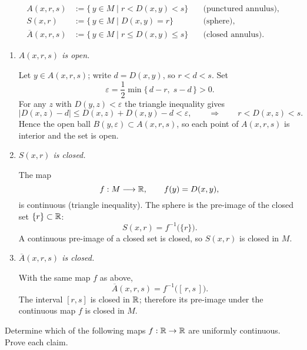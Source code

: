 \documentclass[12pt]{article}
\theoremstyle{definition} %
\theoremstyle{plain} %
\begin{document}
\[
\begin{aligned}
A(x,r,s) &:= \{\,y\in M\mid r<D(x,y)<s\}\quad &\text{(punctured annulus)},\\
S(x,r)   &:= \{\,y\in M\mid D(x,y)=r\}\quad &\text{(sphere)},\\
\overline A(x,r,s) &:= \{\,y\in M\mid r\le D(x,y)\le s\}
                           &\text{(closed annulus).}
\end{aligned}
\]

\begin{enumerate}[label=\textbf{(\alph*)}]
\item \emph{\(A(x,r,s)\) is open.}

   Let \(y\in A(x,r,s)\); write \(d=D(x,y)\), so \(r<d<s\).
   Set
   \[
      \varepsilon=\frac12\min\bigl\{\,d-r,\;s-d\,\bigr\}>0.
   \]
   For any \(z\) with \(D(y,z)<\varepsilon\) the triangle inequality
   gives
   \[
      |D(x,z)-d|\le D(x,z)+D(x,y)-d<\varepsilon,
      \qquad\Longrightarrow\qquad
      r< D(x,z)< s .
   \]
   Hence the open ball \(B(y,\varepsilon)\subset A(x,r,s)\), so each
   point of \(A(x,r,s)\) is interior and the set is open.

\item \emph{\(S(x,r)\) is closed.}

   The map
   \[
      f:M\longrightarrow\Bbb R,\qquad f(y)=D(x,y),
   \]
   is continuous (triangle inequality).
   The sphere is the pre-image of the closed set \(\{r\}\subset\Bbb R\):
   \[
      S(x,r)=f^{-1}\bigl(\{r\}\bigr).
   \]
   A continuous pre-image of a closed set is closed, so \(S(x,r)\) is
   closed in \(M\).

\item \emph{\(\overline A(x,r,s)\) is closed.}

   With the same map \(f\) as above,
   \[
      \overline A(x,r,s)=f^{-1}\bigl([\,r,s\,]\bigr).
   \]
   The interval \([r,s]\) is closed in \(\Bbb R\); therefore its
   pre-image under the continuous map \(f\) is closed in \(M\).

\end{enumerate}
Determine which of the following maps \(f:\Bbb R\to\Bbb R\) are
uniformly continuous.  Prove each claim.
\end{document}

